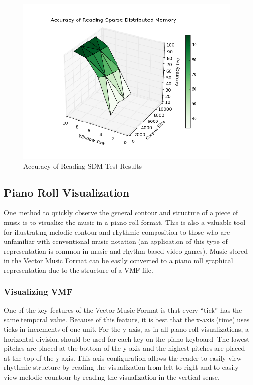 \begin{figure}
  \begin{center}
    \includegraphics[scale=1]{resources/sdm_color.png}
    \caption{Accuracy of Reading SDM Test Results}
    \label{fig:sdmResults}
  \end{center}
\end{figure}


\subsection{Piano Roll Visualization}

One method to quickly observe the general contour and structure of a piece of music is to visualize the music in a piano roll format. This is also a valuable tool for illustrating melodic contour and rhythmic composition to those who are unfamiliar with conventional music notation (an application of this type of representation is common in music and rhythm based video games). Music stored in the Vector Music Format can be easily converted to a piano roll graphical representation due to the structure of a VMF file.

\subsubsection{Visualizing VMF}

One of the key features of the Vector Music Format is that every ``tick'' has the same temporal value. Because of this feature, it is best that the x-axis (time) uses ticks in increments of one unit. For the y-axis, as in all piano roll visualizations, a horizontal division should be used for each key on the piano keyboard. The lowest pitches are placed at the bottom of the y-axis and the highest pitches are placed at the top of the y-axis. This axis configuration allows the reader to easily view rhythmic structure by reading the visualization from left to right and to easily view melodic countour by reading the visualization in the vertical sense.

